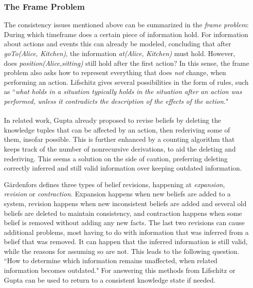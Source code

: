 \documentclass{llncs}
\begin{document}
\subsubsection{The Frame Problem}
The consistency issues mentioned above can be summarized in the \emph{frame problem}: During which timeframe does a certain piece of information hold. For information about actions and events this can already be modeled, concluding that after \emph{goTo(Alice, Kitchen)}, the information \emph{at(Alice, Kitchen)} must hold.\cite{Lifschitz2008} However, does \emph{position(Alice,sitting)} still hold after the first action? In this sense, the frame problem also asks how to represent everything that does \emph{not} change, when performing an action. Lifschitz gives several possibilities in the form of rules, such as ``\emph{what holds in a situation typically holds in the situation after an action was performed, unless it contradicts the description of the effects of the action.}"\\
\\
In related work, Gupta already proposed to revise beliefs by deleting the knowledge tuples that can be affected by an action, then rederiving some of them, insofar possible.\cite{Gupta1993} This is further enhanced by a counting algorithm that keeps track of the number of nonrecursive derivations, to aid the deleting and rederiving. This seems a solution on the side of caution, preferring deleting correctly inferred and still valid information over keeping outdated information.

G\"ardenfors defines three types of belief revisions, happening at \emph{expansion}, \emph{revision} or \emph{contraction}.\cite{Gardenfors2003} Expansion happens when new beliefs are added to a system, revision happens when new inconsistent beliefs are added and several old beliefs are deleted to maintain consistency, and contraction happens when some belief is removed without adding any new facts. The last two revisions can cause additional problems, most having to do with information that was inferred from a belief that was removed. It can happen that the inferred information is still valid, while the reasons for assuming so are not. This leads to the following question. ``How to determine which information remains unaffected, when related information becomes outdated." For answering this methods from Lifschitz\cite{Lifschitz2008} or Gupta\cite{Gupta1993} can be used to return to a consistent knowledge state if needed.

\end{document}
